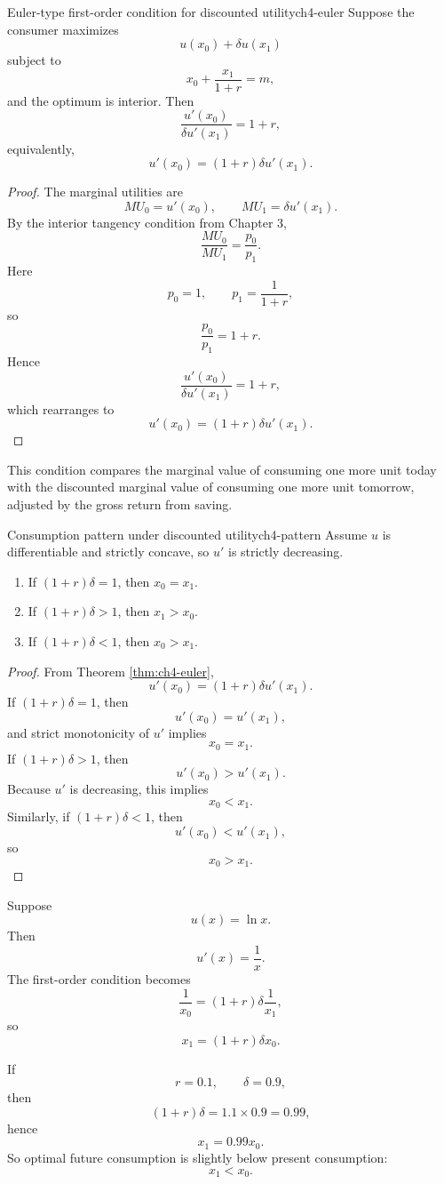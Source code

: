 \begin{theorem}{Euler-type first-order condition for discounted utility}{ch4-euler}
Suppose the consumer maximizes
\[
u(x_0)+\delta u(x_1)
\]
subject to
\[
x_0+\frac{x_1}{1+r}=m,
\]
and the optimum is interior. Then
\[
\frac{u'(x_0)}{\delta u'(x_1)} = 1+r,
\]
equivalently,
\[
u'(x_0) = (1+r)\delta u'(x_1).
\]
\end{theorem}

\begin{proof}
The marginal utilities are
\[
MU_0=u'(x_0), \qquad MU_1=\delta u'(x_1).
\]
By the interior tangency condition from Chapter 3,
\[
\frac{MU_0}{MU_1} = \frac{p_0}{p_1}.
\]
Here
\[
p_0=1, \qquad p_1=\frac{1}{1+r},
\]
so
\[
\frac{p_0}{p_1}=1+r.
\]
Hence
\[
\frac{u'(x_0)}{\delta u'(x_1)}=1+r,
\]
which rearranges to
\[
u'(x_0)=(1+r)\delta u'(x_1).
\]
\end{proof}

This condition compares the marginal value of consuming one more unit today with the discounted marginal value of consuming one more unit tomorrow, adjusted by the gross return from saving.

\begin{theorem}{Consumption pattern under discounted utility}{ch4-pattern}
Assume $u$ is differentiable and strictly concave, so $u'$ is strictly decreasing.
\begin{enumerate}
    \item If $(1+r)\delta = 1$, then $x_0=x_1$.
    \item If $(1+r)\delta > 1$, then $x_1>x_0$.
    \item If $(1+r)\delta < 1$, then $x_0>x_1$.
\end{enumerate}
\end{theorem}

\begin{proof}
From Theorem \ref{thm:ch4-euler},
\[
u'(x_0)=(1+r)\delta u'(x_1).
\]
If $(1+r)\delta=1$, then
\[
u'(x_0)=u'(x_1),
\]
and strict monotonicity of $u'$ implies
\[
x_0=x_1.
\]
If $(1+r)\delta>1$, then
\[
u'(x_0)>u'(x_1).
\]
Because $u'$ is decreasing, this implies
\[
x_0<x_1.
\]
Similarly, if $(1+r)\delta<1$, then
\[
u'(x_0)<u'(x_1),
\]
so
\[
x_0>x_1.
\]
\end{proof}

\begin{examplebox}[title={Worked Example: logarithmic felicity}]
Suppose
\[
u(x)=\ln x.
\]
Then
\[
u'(x)=\frac{1}{x}.
\]
The first-order condition becomes
\[
\frac{1}{x_0} = (1+r)\delta \frac{1}{x_1},
\]
so
\[
x_1=(1+r)\delta x_0.
\]

If
\[
r=0.1, \qquad \delta=0.9,
\]
then
\[
(1+r)\delta = 1.1\times 0.9 = 0.99,
\]
hence
\[
x_1=0.99x_0.
\]
So optimal future consumption is slightly below present consumption:
\[
\boxed{x_1 < x_0.}
\]
\end{examplebox}

